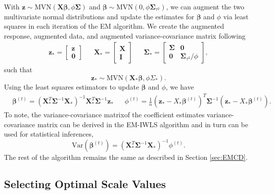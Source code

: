 \documentclass[AMA,STIX1COL,]{WileyNJD-v2}
\begin{document}
With
\(\boldsymbol{z}\sim \text{MVN}(\boldsymbol{X} \boldsymbol{\beta}, \phi \boldsymbol{\Sigma})\)
and
\(\boldsymbol{\beta }\sim \text{MVN}(0, \phi \boldsymbol{\Sigma}_{\tau^2})\),
we can augment the two multivariate normal distributions and update the
estimates for \(\boldsymbol{\beta}\) and \(\phi\) via least squares in
each iteration of the EM algorithm. We create the augmented response,
augmented data, and augmented variance-covariance matrix following
\begin{align*}
& \boldsymbol{z}_* = \begin{bmatrix} \boldsymbol{z}\\ \boldsymbol{0}\end{bmatrix} &&
  \boldsymbol{X}_* = \begin{bmatrix} \boldsymbol{X} \\ \boldsymbol{I} \end{bmatrix} &&
  \boldsymbol{\Sigma}_* = \begin{bmatrix} \boldsymbol{\Sigma }& \boldsymbol{0}  \\ \boldsymbol{0} & \boldsymbol{\Sigma}_{\tau^2}/\phi \end{bmatrix}, &
\end{align*} such that \[
\boldsymbol{z}_* \sim \text{MVN}(\boldsymbol{X}_* \boldsymbol{\beta }, \phi \Sigma_*).
\] Using the least squares estimators to update \(\boldsymbol{\beta}\)
and \(\phi\), we have \begin{align*}
& \boldsymbol{\beta}^{(t)} = (\boldsymbol{X}_*^T \boldsymbol{\Sigma}^{-1} \boldsymbol{X}_*)^{-1}\boldsymbol{X}_*^T \boldsymbol{\Sigma}^{-1} \boldsymbol{z}_* && \phi^{(t)} = \frac{1}{n}(\boldsymbol{z}_*-X_*\boldsymbol{\beta}^{(t)})^T\boldsymbol{\Sigma}^{-1}(\boldsymbol{z}_*-X_*\boldsymbol{\beta}^{(t)}).&
\end{align*} To note, the variance-covariance matrixof the coefficient
estimates variance-covariance matrix can be derived in the EM-IWLS
algorithm and in turn can be used for statistical inferences, \[
  \text{Var}(\boldsymbol{\beta}^{(t)}) = (\boldsymbol{X}_*^T\boldsymbol{\Sigma}^{-1} \boldsymbol{X}_*)^{-1}\phi^{(t)}.
\] The rest of the algorithm remains the same as described in Section
\ref{sec:EMCD}.

\hypertarget{selecting-optimal-scale-values}{%
\subsection{Selecting Optimal Scale
Values}\label{selecting-optimal-scale-values}}
\end{document}

